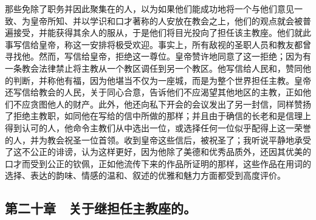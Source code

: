 那些免除了职务并因此聚集在的人，以为如果他们能成功地将一个与他们意见一致、为皇帝所知、并以学识和口才著称的人安放在教会之上，他们的观点就会被普遍接受，并能获得其余人的服从，于是他们将目光投向了担任该主教座。他们就此事写信给皇帝，称这一安排将极受欢迎。事实上，所有敌视的圣职人员和教友都曾寻找他。然而，写信给皇帝，拒绝这一尊位。皇帝赞许地同意了这一拒绝；因为有一条教会法律禁止将主教从一个教区调任到另一个教区。他写信给人民和，赞同他的判断，并称他有福，因为他堪当不仅为一座城，而是为整个世界担任主教。皇帝还写信给教会的人民，关于同心合意，告诉他们不应渴望其他地区的主教，正如他们不应贪图他人的财产。此外，他还向私下开会的会议发出了另一封信，同样赞扬了拒绝主教职，如同他在写给的信中所做的那样；并且由于确信的长老和是信理上得到认可的人，他命令主教们从中选出一位，或选择任何一位似乎配得上这一荣誉的人，并为教会祝圣一位首领。收到皇帝这些信后，被祝圣了；我听说平静地承受了这不公正的诽谤，认为这样更好，因为他除了美德和优秀品质外，还因其优美的口才而受到公正的钦佩，正如他流传下来的作品所证明的那样，这些作品在用词的选择、表达的韵味、情感的温和、叙述的优雅和魅力方面都受到高度评价。\par


\subsection{第二十章　关于继担任主教座的。}

